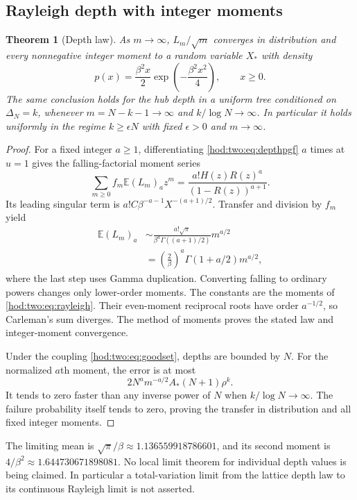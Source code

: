\documentclass[11pt,letterpaper]{article}
\newtheorem{theorem}{Theorem}[section]
\theoremstyle{definition}\newtheorem{definition}[theorem]{Definition}
\theoremstyle{remark}\newtheorem{remark}[theorem]{Remark}
\newcommand{\Ee}{\mathbb E}
\begin{document}
\subsection{Rayleigh depth with integer moments}
\begin{theorem}[Depth law]\label{hod:two:thm:depth}
As $m\to\infty$, $L_m/\sqrt m$ converges in distribution and every nonnegative integer moment to a random variable $X_*$ with density
\begin{equation}\label{hod:two:eq:rayleigh}
p(x)=\frac{\beta^2x}{2}\exp\!\left(-\frac{\beta^2x^2}{4}\right),\qquad x\ge0.
\end{equation}
The same conclusion holds for the hub depth in a uniform tree conditioned on $\Delta_N=k$, whenever $m=N-k-1\to\infty$ and $k/\log N\to\infty$. In particular it holds uniformly in the regime $k\ge\epsilon N$ with fixed $\epsilon>0$ and $m\to\infty$.
\end{theorem}
\begin{proof}
For a fixed integer $a\ge1$, differentiating \eqref{hod:two:eq:depthpgf} $a$ times at $u=1$ gives the falling-factorial moment series
\[
\sum_{m\ge0}f_m\Ee(L_m)_a z^m
=\frac{a!H(z)R(z)^a}{(1-R(z))^{a+1}}.
\]
Its leading singular term is $a!C\beta^{-a-1}X^{-(a+1)/2}$. Transfer and division by $f_m$ yield
\begin{align*}
\Ee(L_m)_a
&\sim\frac{a!\sqrt\pi}{\beta^a\Gamma((a+1)/2)}m^{a/2}\\
&=\left(\frac2\beta\right)^a\Gamma(1+a/2)m^{a/2},
\end{align*}
where the last step uses Gamma duplication. Converting falling to ordinary powers changes only lower-order moments. The constants are the moments of \eqref{hod:two:eq:rayleigh}. Their even-moment reciprocal roots have order $a^{-1/2}$, so Carleman's sum diverges. The method of moments proves the stated law and integer-moment convergence.

Under the coupling \eqref{hod:two:eq:goodset}, depths are bounded by $N$. For the normalized $a$th moment, the error is at most
\[
2N^am^{-a/2}A_*(N+1)\rho^k.
\]
It tends to zero faster than any inverse power of $N$ when $k/\log N\to\infty$. The failure probability itself tends to zero, proving the transfer in distribution and all fixed integer moments.
\end{proof}
The limiting mean is $\sqrt\pi/\beta\approx1.136559918786601$, and its second moment is $4/\beta^2\approx1.644730671898081$. No local limit theorem for individual depth values is being claimed. In particular a total-variation limit from the lattice depth law to its continuous Rayleigh limit is not asserted.
\end{document}
